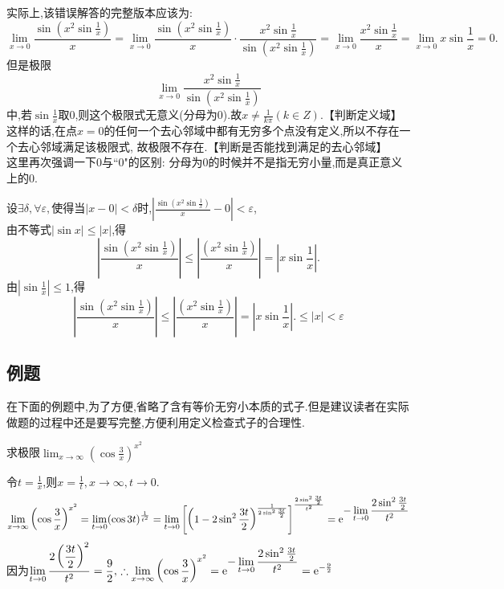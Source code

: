 \solvereason 实际上,该错误解答的完整版本应该为:
\[
\lim_{x \to 0} \frac{\sin \left(x^2 \sin{\frac{1}{x}}\right) }{x}=\lim_{x \to 0} \frac{\sin \left(x^2 \sin{\frac{1}{x}}\right) }{x}\cdot\frac{x^2\sin \frac{1}{x}}{\sin \left( x^2 \sin \frac{1}{x}\right) }=\lim_{x \to 0}\frac{x^2\sin\frac{1}{x}}{x}=\lim_{x \to 0}x\sin \frac{1}{x}=0.
\]
但是极限
\[
\lim_{x \to 0}\frac{x^2\sin \frac{1}{x}}{\sin \left( x^2\sin \frac{1}{x}\right) }
\]
中,若$\displaystyle \sin \frac{1}{x}$取0,则这个极限式无意义(分母为0).故$\displaystyle x \ne \frac{1}{k \pi}(k \in Z).$\hspace*{11.5em}【判断定义域】\\[0.5em]
\hspace*{2em}这样的话,在点$x = 0$的任何一个去心邻域中都有无穷多个点没有定义,所以不存在一个去心邻域满足该极限式,
故极限不存在.\hspace*{24em}【判断是否能找到满足的去心邻域】\\[0.5em]
这里再次强调一下0与``0"的区别: 分母为0的时候并不是指无穷小量,而是真正意义上的0.

\solve 设$\exists \delta, \forall \varepsilon,$使得当$|x-0|<\delta$时,$\displaystyle \left| \frac{\sin \left( x^2\sin\frac{1}{x}\right) }{x}-0\right|<\varepsilon$,\\[0.5em]
由不等式$|\sin x|\le |x|$,得
\[
\left| \frac{\sin \left( x^2\sin\frac{1}{x}\right) }{x}\right| \le \left| \frac{ \left( x^2\sin\frac{1}{x}\right) }{x}\right| =\left| x \sin \frac{1}{x} \right|.
\]
由$\displaystyle \left| \sin \frac{1}{x} \right| \le 1$,得
\[
\left| \frac{\sin \left( x^2\sin\frac{1}{x}\right) }{x}\right| \le \left| \frac{ \left( x^2\sin\frac{1}{x}\right) }{x}\right| =\left| x \sin \frac{1}{x} \right|.\le |x|<\varepsilon
\]

\subsection{例题}
\sj
\example[等价无穷小的运用]\sj
在下面的例题中,为了方便,省略了含有等价无穷小本质的式子.但是建议读者在实际做题的过程中还是要写完整,方便利用定义检查式子的合理性.

\examples 求极限$\displaystyle \lim_{x \to \infty}\left(\cos \frac{3}{x} \right)^{x^2} $

\solve 令$\displaystyle t=\frac{1}{x}$,则$x=\frac{1}{t},x\to \infty ,t \to 0.$
\[
\lim_{x \to \infty}\left(\cos \frac{3}{x} \right)^{x^2} =\lim_{t \to 0}(\cos 3t)^{\frac{1}{t^2}}=\lim_{t \to 0}\left[\left( 1-2\sin^2\frac{3t}{2}\right)^{\frac{1}{2\sin^2\frac{3t}{2}}} \right]^{\frac{2\sin^2\frac{3t}{2}}{t^2}} ={\rm{e}}^{\displaystyle -\lim_{t \to 0}\frac{2\sin^2\frac{3t}{2}}{t^2}}
\]
因为$\displaystyle \lim_{t \to 0}\frac{2\left( \displaystyle \frac{3t}{2}\right)^2 }{t^2}=\frac{9}{2},\,\therefore \lim_{x \to \infty }\left(\cos \frac{3}{x} \right)^{x^2}={\rm{e}}^{ \displaystyle  -\lim_{t \to 0}\frac{2\sin^2\frac{3t}{2}}{t^2}}={\rm{e}} ^{-\frac{9}{2}} $

